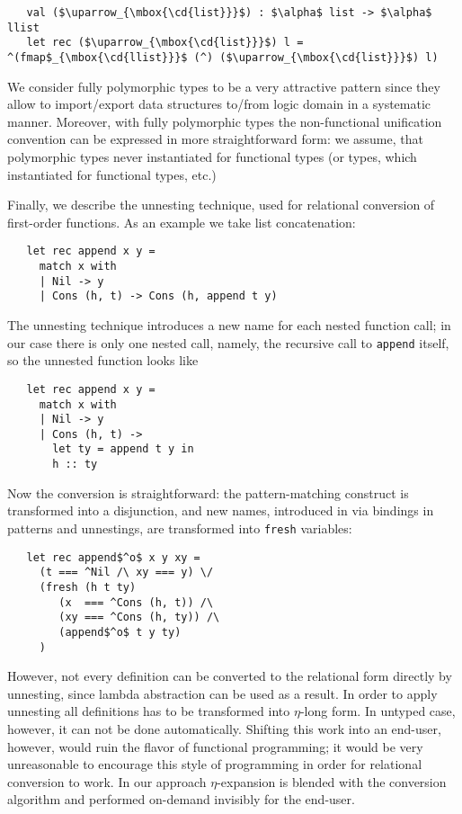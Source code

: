 \begin{lstlisting}
   val ($\uparrow_{\mbox{\cd{list}}}$) : $\alpha$ list -> $\alpha$ llist
   let rec ($\uparrow_{\mbox{\cd{list}}}$) l = ^(fmap$_{\mbox{\cd{llist}}}$ (^) ($\uparrow_{\mbox{\cd{list}}}$) l)
\end{lstlisting}

We consider fully polymorphic types to be a very attractive pattern since they allow to import/export
data structures to/from logic domain in a systematic manner. Moreover, with fully polymorphic types the non-functional
unification convention can be expressed in more straightforward form: we assume, that polymorphic types never
instantiated for functional types (or types, which instantiated for functional types, etc.)

Finally, we describe the unnesting technique, used for relational conversion of first-order functions. As an example we take
list concatenation:

\begin{lstlisting}
   let rec append x y =
     match x with
     | Nil -> y
     | Cons (h, t) -> Cons (h, append t y)
\end{lstlisting}

The unnesting technique introduces a new name for each nested function call; in our case there is only one nested call, namely,
the recursive call to \lstinline|append| itself, so the unnested function looks like

\begin{lstlisting}
   let rec append x y =
     match x with 
     | Nil -> y
     | Cons (h, t) -> 
       let ty = append t y in
       h :: ty
\end{lstlisting}

Now the conversion is straightforward: the pattern-matching construct is transformed into a disjunction, and new names, 
introduced in via bindings in patterns and unnestings, are transformed into \lstinline|fresh| variables:

\begin{lstlisting}
   let rec append$^o$ x y xy =
     (t === ^Nil /\ xy === y) \/
     (fresh (h t ty)
        (x  === ^Cons (h, t)) /\
        (xy === ^Cons (h, ty)) /\
        (append$^o$ t y ty)
     )
\end{lstlisting}

However, not every definition can be converted to the relational form directly by unnesting, since lambda abstraction
can be used as a result. In order to apply unnesting all definitions has to be transformed into $\eta$-long form. In
untyped case, however, it can not be done automatically. Shifting this work into an end-user, however, would ruin 
the flavor of functional programming; it would be very unreasonable to encourage this style of programming in order 
for relational conversion to work. In our approach $\eta$-expansion is blended with the conversion algorithm and 
performed on-demand invisibly for the end-user.








